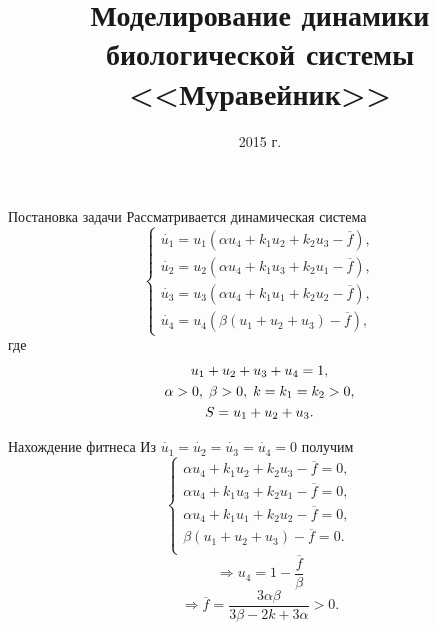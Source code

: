 \documentclass{beamer}
\begin{document}
\title[Анализ системы <<Муравейник>>]
{Моделирование динамики биологической системы <<Муравейник>>}
\date{2015 г.}
\maketitle

\begin{frame}{Постановка задачи}
Рассматривается динамическая система
$$
\left\{
\begin{aligned}
\dot{u_1} = u_1 \left( \alpha u_4 + k_1 u_2 + k_2 u_3 - \overline{f} \right), \\
\dot{u_2} = u_2 \left( \alpha u_4 + k_1 u_3 + k_2 u_1 - \overline{f} \right), \\
\dot{u_3} = u_3 \left( \alpha u_4 + k_1 u_1 + k_2 u_2 - \overline{f} \right), \\
\dot{u_4} = u_4 \left( \beta \left( u_1 + u_2 + u_3 \right) - \overline{f} \right),
\end{aligned}
\right.
$$
где
\begin{gather}
u_1 + u_2 + u_3 + u_4 = 1, \notag \\
\alpha > 0, \; \beta > 0, \; k = k_1 = k_2 > 0, \notag \\
S = u_1 + u_2 + u_3. \notag
\end{gather}
\end{frame}

\begin{frame}{Нахождение фитнеса}
	Из $\dot{u_1} = \dot{u_2} = \dot{u_3} = \dot{u_4} = 0$ получим
	$$
	\left\{
	\begin{aligned}
	\alpha u_4 + k_1 u_2 + k_2 u_3 - \overline{f} = 0, \\
	\alpha u_4 + k_1 u_3 + k_2 u_1 - \overline{f} = 0, \\
	\alpha u_4 + k_1 u_1 + k_2 u_2 - \overline{f} = 0, \\
	\beta \left( u_1 + u_2 + u_3 \right) - \overline{f} = 0. \\
	\end{aligned}
	\right.
	$$
	$$
	\Rightarrow u_4 = 1 - \frac{\overline{f}}{\beta}
	$$
	$$
	\Rightarrow \overline{f} = \frac{3\alpha\beta}{3\beta - 2k + 3\alpha} > 0.
	$$
\end{frame}
\end{document}
